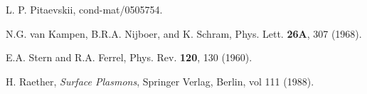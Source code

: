 \documentclass[prl,nofootinbib,twocolumn,showpacs]{revtex4}
\begin{document}
\begin{thebibliography}{99}
 L. P. Pitaevskii, cond-mat/0505754.

 N.G. van Kampen, B.R.A. Nijboer, and K. Schram, Phys. Lett.
{\bf 26A}, 307 (1968).

 E.A. Stern and R.A. Ferrel, Phys. Rev. {\bf 120}, 130 (1960).

 H. Raether, {\it Surface Plasmons}, Springer Verlag, Berlin, vol 111
(1988).





\end{thebibliography}
\end{document}
